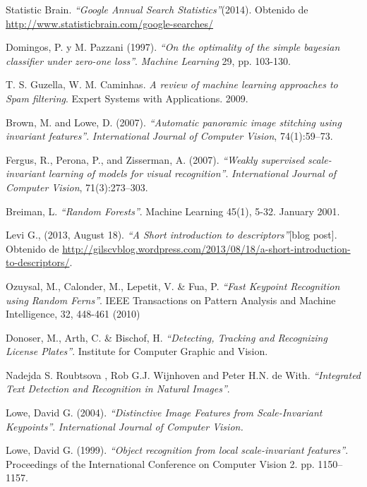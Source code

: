 \begin{thebibliography}{100}
	Statistic Brain.
	\emph{``Google Annual Search Statistics''}(2014).
	Obtenido de \url{http://www.statisticbrain.com/google-searches/}
	
		Domingos, P. y M. Pazzani (1997).
		\emph{``On the optimality of the simple bayesian classifier under zero-one loss''}. \textit{Machine Learning} 29, pp. 103-130.
		
		T. S. Guzella, W. M. Caminhas.
		\emph{A review of machine learning approaches to Spam filtering}.
		Expert Systems with Applications.
		2009.
		
		Brown, M. and Lowe, D. (2007).
		\emph{``Automatic panoramic image stitching using invariant features''}.
		\textit{International Journal of Computer Vision},
		74(1):59–73.
	
		Fergus, R., Perona, P., and Zisserman, A. (2007).
		\emph{``Weakly supervised scale-invariant learning of models for visual recognition''}.
		\textit{International Journal of Computer Vision},
		71(3):273–303.
		
		Breiman, L.
		\emph{``Random Forests''}.
		Machine Learning 45(1), 5-32.
		January 2001.
		
				
		Levi G., (2013, August 18).
		\emph{``A Short introduction to descriptors''}[blog post].
		Obtenido de \url{http://gilscvblog.wordpress.com/2013/08/18/a-short-introduction-to-descriptors/}.
	
		Ozuysal, M., Calonder, M., Lepetit, V. \& Fua, P.
		\emph{``Fast Keypoint Recognition using Random Ferns''}.
		IEEE Transactions on Pattern Analysis and Machine Intelligence,
		32, 448-461 (2010)
		
		Donoser, M., Arth, C. \& Bischof, H.
		\emph{``Detecting, Tracking and Recognizing License Plates''}.
		Institute for Computer Graphic and Vision.
		
		Nadejda S. Roubtsova , Rob G.J. Wijnhoven and Peter H.N. de With.
		\emph{``Integrated Text Detection and Recognition in Natural Images''}.
		
		Lowe, David G. (2004).
		\emph{``Distinctive Image Features from Scale-Invariant Keypoints''}.
		\textit{International Journal of Computer Vision.}
		
		Lowe, David G. (1999).
		\emph{``Object recognition from local scale-invariant features''}.
		Proceedings of the International Conference on Computer Vision 2.
		pp. 1150–1157.
		

\end{thebibliography}
